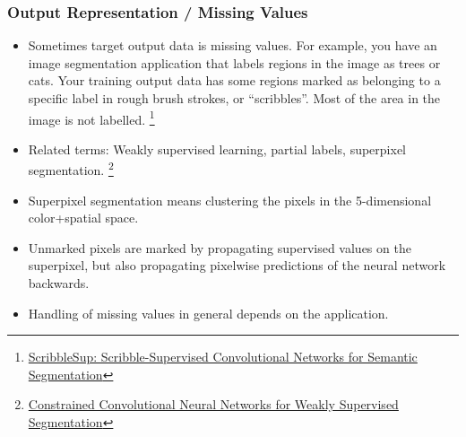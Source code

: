\documentclass[8pt]{beamer}
\begin{document}
\begin{frame}
\frametitle{Output Representation / Missing Values}
 \begin{itemize}
  \item Sometimes target output data is missing values. For example, you have an image segmentation application that labels regions in the image as trees or cats.
        Your training output data has some regions marked as belonging to a specific label in rough brush strokes, or ``scribbles''. Most of the area in the image is not labelled.
  \footnote{\href{http://arxiv.org/pdf/1604.05144v1.pdf}
                 {ScribbleSup: Scribble-Supervised Convolutional Networks for Semantic Segmentation}}
  \item Related terms: Weakly supervised learning, partial labels, superpixel segmentation.
  \footnote{\href{http://www.cv-foundation.org/openaccess/content\_cvpr\_2015/papers/Xu\_Learning\_to\_Segment\_2015\_CVPR\_paper.pdf}
       {Constrained Convolutional Neural Networks for Weakly Supervised Segmentation}}
  \item Superpixel segmentation means clustering the pixels in the 5-dimensional color+spatial space.
  \item Unmarked pixels are marked by propagating supervised values on the superpixel,
        but also propagating pixelwise predictions of the neural network backwards.
  \item Handling of missing values in general depends on the application.
        
 \end{itemize} 
\end{frame}
\end{document}
